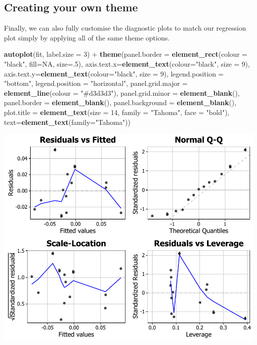 \documentclass[]{article}
\newenvironment{Shaded}{\begin{snugshade}}{\end{snugshade}}
\newcommand{\KeywordTok}[1]{\textcolor[rgb]{0.13,0.29,0.53}{\textbf{{#1}}}}
\newcommand{\DataTypeTok}[1]{\textcolor[rgb]{0.13,0.29,0.53}{{#1}}}
\newcommand{\DecValTok}[1]{\textcolor[rgb]{0.00,0.00,0.81}{{#1}}}
\newcommand{\StringTok}[1]{\textcolor[rgb]{0.31,0.60,0.02}{{#1}}}
\newcommand{\OtherTok}[1]{\textcolor[rgb]{0.56,0.35,0.01}{{#1}}}
\newcommand{\NormalTok}[1]{{#1}}
\begin{document}
\subsection{Creating your own theme}\label{creating-your-own-theme-1}

Finally, we can also fully customise the diagnostic plots to match our
regression plot simply by applying all of the same theme options.

\begin{Shaded}
\begin{Highlighting}[]
\KeywordTok{autoplot}\NormalTok{(fit, }\DataTypeTok{label.size =} \DecValTok{3}\NormalTok{) +}\StringTok{ }\KeywordTok{theme}\NormalTok{(}\DataTypeTok{panel.border =} \KeywordTok{element_rect}\NormalTok{(}\DataTypeTok{colour =} \StringTok{"black"}\NormalTok{, }\DataTypeTok{fill=}\OtherTok{NA}\NormalTok{, }\DataTypeTok{size=}\NormalTok{.}\DecValTok{5}\NormalTok{),}
    \DataTypeTok{axis.text.x=}\KeywordTok{element_text}\NormalTok{(}\DataTypeTok{colour=}\StringTok{"black"}\NormalTok{, }\DataTypeTok{size =} \DecValTok{9}\NormalTok{), }
    \DataTypeTok{axis.text.y=}\KeywordTok{element_text}\NormalTok{(}\DataTypeTok{colour=}\StringTok{"black"}\NormalTok{, }\DataTypeTok{size =} \DecValTok{9}\NormalTok{), }
    \DataTypeTok{legend.position =} \StringTok{"bottom"}\NormalTok{, }\DataTypeTok{legend.position =} \StringTok{"horizontal"}\NormalTok{,}
    \DataTypeTok{panel.grid.major =} \KeywordTok{element_line}\NormalTok{(}\DataTypeTok{colour =} \StringTok{"#d3d3d3"}\NormalTok{), }
    \DataTypeTok{panel.grid.minor =} \KeywordTok{element_blank}\NormalTok{(), }
    \DataTypeTok{panel.border =} \KeywordTok{element_blank}\NormalTok{(), }\DataTypeTok{panel.background =} \KeywordTok{element_blank}\NormalTok{(),}
    \DataTypeTok{plot.title =} \KeywordTok{element_text}\NormalTok{(}\DataTypeTok{size =} \DecValTok{14}\NormalTok{, }\DataTypeTok{family =} \StringTok{"Tahoma"}\NormalTok{, }\DataTypeTok{face =} \StringTok{"bold"}\NormalTok{),}
    \DataTypeTok{text=}\KeywordTok{element_text}\NormalTok{(}\DataTypeTok{family=}\StringTok{"Tahoma"}\NormalTok{))}
\end{Highlighting}
\end{Shaded}

\begin{center}\includegraphics{11_Linear_Regression_Plot_pdf/lr_24-1} \end{center}
\end{document}
